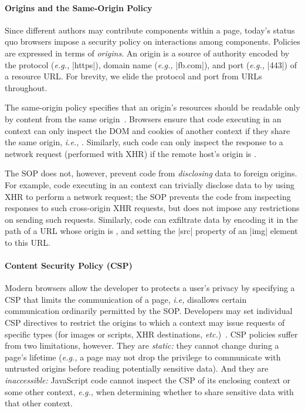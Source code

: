 \paragraph{Origins and the Same-Origin Policy}
Since different authors may contribute components within a page,
today's status quo browsers impose a security policy on interactions
among components. Policies are expressed in terms of \emph{origins}.
An origin is a source of authority encoded by the protocol (\emph{e.g.,}
\js|https|), domain name (\emph{e.g.,} \js|fb.com|), and port (\emph{e.g.,} \js|443|)
of a resource URL. For brevity, we elide the protocol and
port from URLs throughout.

The same-origin policy specifies that an origin's
resources should be readable only by content from the same
origin~\cite{rfc6454, googlehandbook, VanKesteren2012}.  Browsers
ensure that code executing in an  context can only
inspect the DOM and cookies of another context if they share the same
origin, \emph{i.e.,} . Similarly, such code can only
inspect the response to a network request (performed with XHR) if the
remote host's origin is .
%
 
The SOP does not, however, prevent code from \emph{disclosing} data to
foreign origins. For example, code executing in an 
context can trivially disclose data to  by using XHR to
perform a network request; the SOP prevents the code from
inspecting responses to such cross-origin XHR requests, but does not
impose any restrictions on sending such requests.
Similarly, code can exfiltrate data by encoding it in the path of a
URL whose origin is , and setting the \js|src| property
of an \js|img| element to this URL.

\paragraph{Content Security Policy (CSP)}

Modern browsers allow the developer to protects a user's privacy by
specifying a CSP that limits the communication of a page, \emph{i.e,}
disallows certain communication ordinarily permitted by the SOP\@.
Developers may set individual CSP directives to restrict the origins
to which a context may issue requests of specific types (for images or
scripts, XHR destinations, \emph{etc.})~\cite{csp}. CSP policies
suffer from two limitations, however. They are {\em static:} they
cannot change during a page's lifetime (\emph{e.g.,} a page may not
drop the privilege to communicate with untrusted origins before
reading potentially sensitive data). And they are {\em inaccessible:}
JavaScript code cannot inspect the CSP of its enclosing context or
some other context, \emph{e.g.,} when determining whether to share
sensitive data with that other context.

